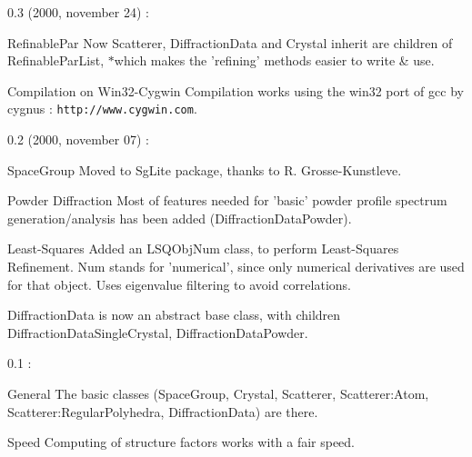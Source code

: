 \begin{DoxyParagraph}{0.3 (2000, november 24) \-: }
\begin{DoxyItemize}
\item Refinable\-Par Now Scatterer, Diffraction\-Data and Crystal inherit are children of Refinable\-Par\-List, $\ast$which makes the 'refining' methods easier to write \& use. \item Compilation on Win32-\/\-Cygwin Compilation works using the win32 port of gcc by cygnus \-: {\tt http\-://www.\-cygwin.\-com}.\end{DoxyItemize}

\end{DoxyParagraph}
\begin{DoxyParagraph}{0.2 (2000, november 07) \-: }
\begin{DoxyItemize}
\item Space\-Group Moved to Sg\-Lite package, thanks to R. Grosse-\/\-Kunstleve. \item Powder Diffraction Most of features needed for 'basic' powder profile spectrum generation/analysis has been added (Diffraction\-Data\-Powder). \item Least-\/\-Squares Added an L\-S\-Q\-Obj\-Num class, to perform Least-\/\-Squares Refinement. Num stands for 'numerical', since only numerical derivatives are used for that object. Uses eigenvalue filtering to avoid correlations. \item Diffraction\-Data is now an abstract base class, with children Diffraction\-Data\-Single\-Crystal, Diffraction\-Data\-Powder.\end{DoxyItemize}

\end{DoxyParagraph}
\begin{DoxyParagraph}{0.1 \-:}
\begin{DoxyItemize}
\item General The basic classes (Space\-Group, Crystal, Scatterer, Scatterer\-:Atom, Scatterer\-:Regular\-Polyhedra, Diffraction\-Data) are there. \item Speed Computing of structure factors works with a fair speed. \end{DoxyItemize}

\end{DoxyParagraph}

